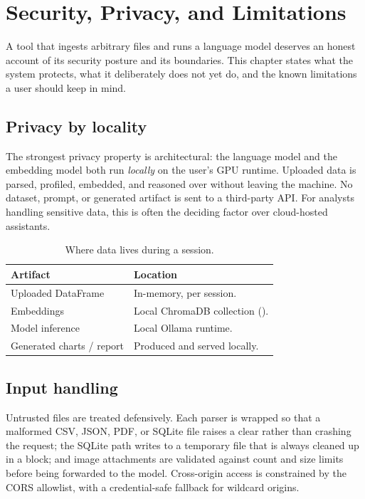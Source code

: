 \chapter{Security, Privacy, and Limitations}
\label{ch:security}

A tool that ingests arbitrary files and runs a language model deserves an honest
account of its security posture and its boundaries. This chapter states what the
system protects, what it deliberately does not yet do, and the known limitations
a user should keep in mind.

\section{Privacy by locality}
The strongest privacy property is architectural: the language model and the
embedding model both run \emph{locally} on the user's GPU runtime. Uploaded data
is parsed, profiled, embedded, and reasoned over without leaving the machine. No
dataset, prompt, or generated artifact is sent to a third-party API. For
analysts handling sensitive data, this is often the deciding factor over
cloud-hosted assistants.

\begin{table}[h]
\centering
\caption{Where data lives during a session.}
\small
\begin{tabularx}{\linewidth}{@{}L{3.6cm} X@{}}
\toprule
\textbf{Artifact} & \textbf{Location} \\
\midrule
Uploaded DataFrame & In-memory, per session. \\
Embeddings & Local ChromaDB collection (). \\
Model inference & Local Ollama runtime. \\
Generated charts / report & Produced and served locally. \\
\bottomrule
\end{tabularx}
\end{table}

\section{Input handling}
Untrusted files are treated defensively. Each parser is wrapped so that a
malformed CSV, JSON, PDF, or SQLite file raises a clear  rather
than crashing the request; the SQLite path writes to a temporary file that is
always cleaned up in a  block; and image attachments are validated
against count and size limits before being forwarded to the model. Cross-origin
access is constrained by the CORS allowlist, with a credential-safe fallback for
wildcard origins.

